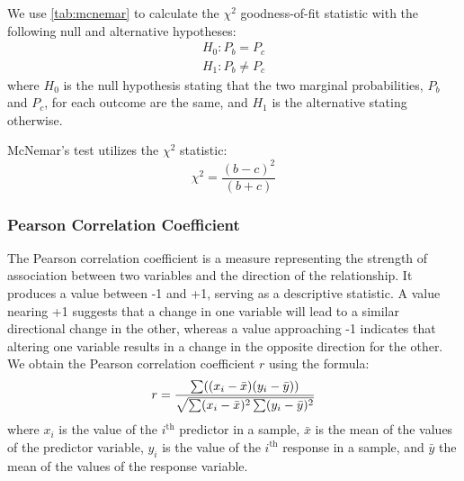 We use \cref{tab:mcnemar} to calculate the $\chi^2$ goodness-of-fit statistic with the following null and alternative hypotheses:
\begin{equation}
\begin{array}{c}
    H_0: P_b = P_c   \\
    H_1: P_b \neq P_c  
\end{array}
\end{equation}
where \(H_0\) is the null hypothesis stating that the two marginal probabilities, $P_b$ and $P_c$, for each outcome are the same, and \(H_1\) is the alternative stating otherwise.

McNemar's test utilizes the $\chi^2$ statistic:
\begin{equation}
    \chi^2 = \frac{(b-c)^2}{(b + c)}
\end{equation}

\subsubsection{Pearson Correlation Coefficient}
\hfill \break
The Pearson correlation coefficient is a measure representing the strength of association between two variables and the direction of the relationship. It produces a value between -1 and +1, serving as a descriptive statistic. A value nearing +1 suggests that a change in one variable will lead to a similar directional change in the other, whereas a value approaching -1 indicates that altering one variable results in a change in the opposite direction for the other. We obtain the Pearson correlation coefficient $r$ using the formula:
\begin{equation}
     r = \frac{\sum((x_i - \Bar{x})(y_i - \Bar{y}))}{\sqrt{\sum(x_i - \Bar{x})^2\sum(y_i - \Bar{y})^2}}
\end{equation}
where $x_i$ is the value of the $i^\mathrm{th}$ predictor in a sample, $\bar{x}$ is the mean of the values of the predictor variable, $y_i$ is the value of the $i^\mathrm{th}$ response in a sample, and $\bar{y}$ the mean of the values of the response variable.

